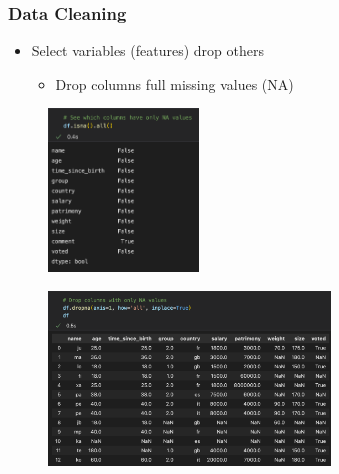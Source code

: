 \begin{frame}\frametitle{Data Cleaning}
   \begin{itemize}
      \item Select variables (features) drop others
      \begin{itemize}
         \item Drop columns full missing values (NA)
      \end{itemize}
   \end{itemize}
   \vspace{1cm}
   \begin{minipage}{0.38\linewidth}
      \begin{figure}[H]
         \includegraphics[width=4cm]{../images/illustrations/data_cleaning_detect_columns_na.png}
      \end{figure}
   \end{minipage}
   \begin{minipage}{0.58\linewidth}
      \begin{figure}[H]
         \includegraphics[width=7.5cm]{../images/illustrations/data_cleaning_drop_columns_full_na.png}
      \end{figure}
   \end{minipage}
\end{frame}


